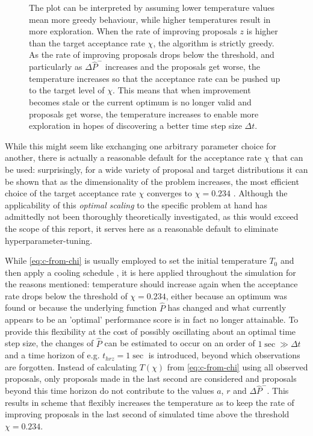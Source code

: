 \documentclass[oneside, a4paper]{book}
\newcommand\br[1]{\left(#1\right)}
\begin{document}
\begin{figure}
{      The plot can be interpreted by assuming lower temperature values mean more greedy behaviour, while higher temperatures result in more exploration. When the rate of improving proposals $z$ is higher than the target acceptance rate $\chi$, the algorithm is strictly greedy. As the rate of improving proposals drops below the threshold, and particularly as $\Delta \hat{P}^-$ increases and the proposals get worse, the temperature increases so that the acceptance rate can be pushed up to the target level of $\chi$. This means that when improvement becomes stale or the current optimum is no longer valid and proposals get worse, the temperature increases to enable more exploration in hopes of discovering a better time step size $\Delta t$.}
      \label{fig:temperature}
    \end{figure}

    While this might seem like exchanging one arbitrary parameter choice for another, there is actually a reasonable default for the acceptance rate $\chi$ that can be used: surprisingly, for a wide variety of proposal and target distributions it can be shown that as the dimensionality of the problem increases, the most efficient choice of the target acceptance rate $\chi$ converges to $\chi=0.234$ \autocites{moving-beyond-0234}{exploring-0234-arxiv}. Although the applicability of this \textit{optimal scaling} to the specific problem at hand has admittedly not been thoroughly theoretically investigated, as this would exceed the scope of this report, it serves here as a reasonable default to eliminate hyperparameter-tuning. 
    
    While \autoref{eq:c-from-chi} is usually employed to set the initial temperature $T_0$ and then apply a cooling schedule \autocite{simulated-annealing}, it is here applied throughout the simulation for the reasons mentioned: temperature should increase again when the acceptance rate drops below the threshold of $\chi=0.234$, either because an optimum was found or because the underlying function $\hat{P}$ has changed and what currently appears to be an 'optimal' performance score is in fact no longer attainable. 
    To provide this flexibility at the cost of possibly oscillating about an optimal time step size, the changes of $\hat{P}$ can be estimated to occur on an order of $1\sec \gg \Delta t$ and a time horizon of e.g. $t_{hrz}=1\sec$ is introduced, beyond which observations are forgotten. Instead of calculating $T\br{\chi}$ from \autoref{eq:c-from-chi} using all observed proposals, only proposals made in the last second are considered and proposals beyond this time horizon do not contribute to the values $a$, $r$ and $\Delta \hat{P}^-$. This results in scheme that flexibly increases the temperature as to keep the rate of improving proposals in the last second of simulated time above the threshold $\chi=0.234$. 
\end{document}
